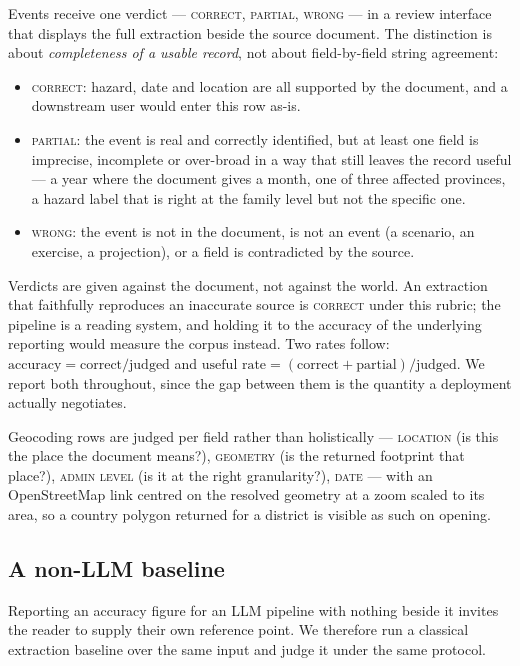 Events receive one verdict --- \textsc{correct}, \textsc{partial},
\textsc{wrong} --- in a review interface that displays the full extraction
beside the source document. The distinction is about \emph{completeness of a
usable record}, not about field-by-field string agreement:

\begin{itemize}\itemsep2pt
  \item \textsc{correct}: hazard, date and location are all supported by the
    document, and a downstream user would enter this row as-is.
  \item \textsc{partial}: the event is real and correctly identified, but at
    least one field is imprecise, incomplete or over-broad in a way that
    still leaves the record useful --- a year where the document gives a
    month, one of three affected provinces, a hazard label that is right at
    the family level but not the specific one.
  \item \textsc{wrong}: the event is not in the document, is not an event
    (a scenario, an exercise, a projection), or a field is contradicted by
    the source.
\end{itemize}

Verdicts are given against the document, not against the world. An extraction
that faithfully reproduces an inaccurate source is \textsc{correct} under this
rubric; the pipeline is a reading system, and holding it to the accuracy of the
underlying reporting would measure the corpus instead. Two rates follow:
$\text{accuracy} = \text{correct}/\text{judged}$ and
$\text{useful rate} = (\text{correct}+\text{partial})/\text{judged}$. We report
both throughout, since the gap between them is the quantity a deployment
actually negotiates.

Geocoding rows are judged per field rather than holistically ---
\textsc{location} (is this the place the document means?), \textsc{geometry}
(is the returned footprint that place?), \textsc{admin level} (is it at the
right granularity?), \textsc{date} --- with an OpenStreetMap link centred on
the resolved geometry at a zoom scaled to its area, so a country polygon
returned for a district is visible as such on opening.

\subsection{A non-LLM baseline}
\label{ssec:baseline}

Reporting an accuracy figure for an LLM pipeline with nothing beside it invites
the reader to supply their own reference point. We therefore run a classical
extraction baseline over the same input and judge it under the same protocol.

